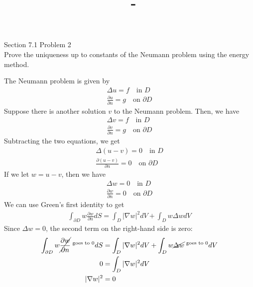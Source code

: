 \documentclass[answers,12pt,addpoints]{exam}
\author{\name}
\title{\course \ - \assignment}
\begin{document}
\maketitle


\newpage
\begin{questions}
    \question Section 7.1 Problem 2\\
    Prove the uniqueness up to constants of the Neumann problem using the energy method.
    \begin{solution}
        The Neumann problem is given by
        \begin{align*}
            \Delta u = f \quad \text{in } D\\
            \frac{\partial u}{\partial n} = g \quad \text{on } \partial D
        \end{align*}
        Suppose there is another solution $v$ to the Neumann problem. Then, we have
        \begin{align*}
            \Delta v = f \quad \text{in } D\\
            \frac{\partial v}{\partial n} = g \quad \text{on } \partial D
        \end{align*}
        Subtracting the two equations, we get
        \begin{align*}
            \Delta (u - v) = 0 \quad \text{in } D\\
            \frac{\partial (u - v)}{\partial n} = 0 \quad \text{on } \partial D
        \end{align*}
        If we let $w = u - v$, then we have
        \begin{align*}
            \Delta w = 0 \quad \text{in } D\\
            \frac{\partial w}{\partial n} = 0 \quad \text{on } \partial D
        \end{align*}
        We can use Green's first identity to get
        \begin{align*}
            \int_{\partial D} w \frac{\partial w}{\partial n} dS = \int_D |\nabla w|^2 dV + \int_D w \Delta w dV
        \end{align*}
        Since $\Delta w = 0$, the second term on the right-hand side is zero:
        \begin{align*}
            \int_{\partial D} w \cancel{\frac{\partial w}{\partial n}}^{\text{ goes to }0} dS &= \int_D |\nabla w|^2 dV + \int_D w \cancel{\Delta w}^{\text{ goes to }0} dV\\
            0 &= \int_D |\nabla w|^2 dV\\
            |\nabla w|^2 &= 0\\

\end{align*}
\end{solution}
\end{questions}
\end{document}
